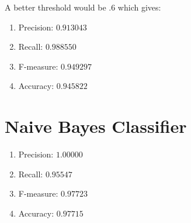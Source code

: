 \documentclass[12pt]{article}
\begin{document}
A better threshold would be $.6$ which gives:
\begin{enumerate}
    \item Precision: $0.913043$
    \item Recall:    $0.988550$
    \item F-measure: $0.949297$
    \item Accuracy:  $0.945822$
\end{enumerate}

\newpage


\section{Naive Bayes Classifier}\label{naive}
\begin{enumerate}
    \item Precision: $1.00000$
    \item Recall:    $0.95547$
    \item F-measure: $0.97723$
    \item Accuracy:  $0.97715$
\end{enumerate}
\end{document}
